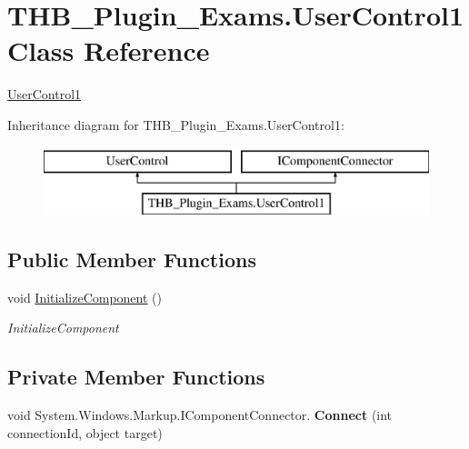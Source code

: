 \hypertarget{class_t_h_b___plugin___exams_1_1_user_control1}{}\section{T\+H\+B\+\_\+\+Plugin\+\_\+\+Exams.\+User\+Control1 Class Reference}
\label{class_t_h_b___plugin___exams_1_1_user_control1}


\mbox{\hyperlink{class_t_h_b___plugin___exams_1_1_user_control1}{User\+Control1}}  


Inheritance diagram for T\+H\+B\+\_\+\+Plugin\+\_\+\+Exams.\+User\+Control1\+:\begin{figure}[H]
\begin{center}
\leavevmode
\includegraphics[height=2.000000cm]{d4/ddd/class_t_h_b___plugin___exams_1_1_user_control1}
\end{center}
\end{figure}
\subsection*{Public Member Functions}
\begin{DoxyCompactItemize}
\item 
void \mbox{\hyperlink{class_t_h_b___plugin___exams_1_1_user_control1_a00b30a8b0179c27805d9f9565070adba}{Initialize\+Component}} ()
\begin{DoxyCompactList}\small\item\em Initialize\+Component \end{DoxyCompactList}\end{DoxyCompactItemize}
\subsection*{Private Member Functions}
\begin{DoxyCompactItemize}
\item 
\mbox{\label{class_t_h_b___plugin___exams_1_1_user_control1_adcd9edc13c61ced201761f6b90e32ab4}} 
void System.\+Windows.\+Markup.\+I\+Component\+Connector. {\bfseries Connect} (int connection\+Id, object target)
\end{DoxyCompactItemize}
